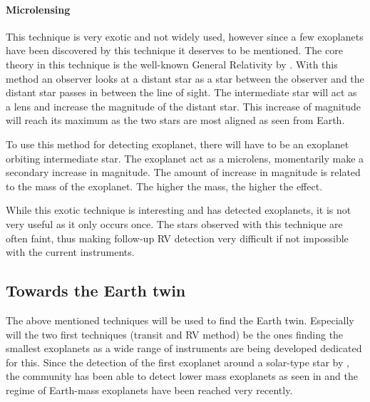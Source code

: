 \paragraph{Microlensing}

This technique is very exotic and not widely used, however since a few exoplanets have been
discovered by this technique it deserves to be mentioned. The core theory in this technique is the
well-known General Relativity by \citet{Einstein1916}. With this method an observer looks at a
distant star as a star between the observer and the distant star passes in between the line of
sight. The intermediate star will act as a lens and increase the magnitude of the distant star. This
increase of magnitude will reach its maximum as the two stars are most aligned as seen from Earth.

To use this method for detecting exoplanet, there will have to be an exoplanet orbiting intermediate
star. The exoplanet act as a microlens, momentarily make a secondary increase in magnitude. The
amount of increase in magnitude is related to the mass of the exoplanet. The higher the mass, the
higher the effect.

While this exotic technique is interesting and has detected exoplanets, it is not very useful as it
only occurs once. The stars observed with this technique are often faint, thus making follow-up RV
detection very difficult if not impossible with the current instruments.


\subsection{Towards the Earth twin}

The above mentioned techniques will be used to find the Earth twin. Especially will the two first
techniques (transit and RV method) be the ones finding the smallest exoplanets as a wide range of
instruments are being developed dedicated for this. Since the detection of the first exoplanet
around a solar-type star by \citet{Mayor1995}, the community has been able to detect lower mass
exoplanets as seen in  and the regime of Earth-mass exoplanets have been
reached very recently.

